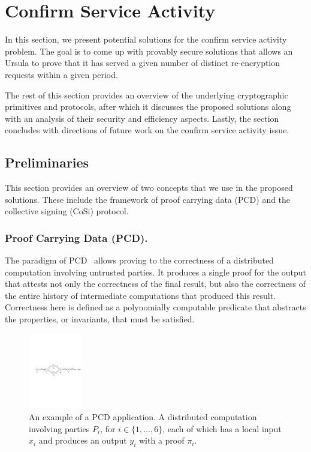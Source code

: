 \section{Confirm Service Activity}
\label{confirm-service-actiivty}
In this section, we present potential solutions for the confirm service activity 
problem. The goal is to come up with provably secure solutions that allows an 
Ursula to prove that it has served a given number of distinct re-encryption 
requests within a given period. 


The rest of this section provides an overview of the underlying cryptographic primitives and 
protocols, after which it discusses the proposed solutions along with an analysis of 
their security and efficiency aspects. Lastly, the section concludes with directions of 
future work on the confirm service activity issue.


\subsection{Preliminaries}
\label{prelim}
This section provides an overview of two concepts that we use in the 
proposed solutions. These include the framework of proof carrying data (PCD) 
and the collective signing (CoSi) protocol.


\subsubsection{Proof Carrying Data (PCD).}
The paradigm of PCD~\cite{chiesa2010proof} allows proving to the correctness of a distributed 
computation involving untrusted parties. It produces a single proof for the output 
that attests not only the correctness of the final result, but also 
the correctness of the entire history of intermediate computations that produced 
this result. Correctness here is defined as a polynomially computable predicate that 
abstracts the properties, or invariants, that must be satisfied.


\begin{figure}[h!]
\centerline{
\includegraphics[height= 1.3in, width = 1.0\columnwidth]{figures/pcd-diagram.pdf}}
\caption{An example of a PCD application. A distributed computation involving parties $P_i$, for 
$i \in \{1, \dots, 6\}$, each 
of which has a local input $x_i$ and produces an output $y_i$ with a proof $\pi_i$. }
\label{pcd-diagram}
\end{figure}


